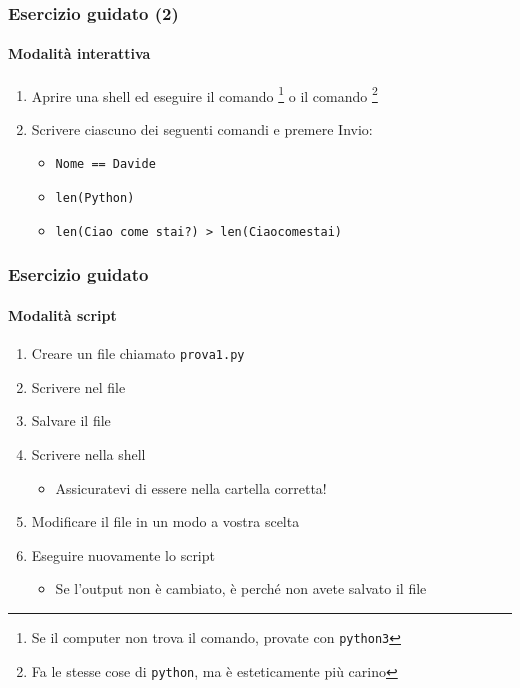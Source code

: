 \begin{exerciseframe}
    \frametitle{Esercizio guidato (2)}
    \framesubtitle{Modalità interattiva}

    \begin{enumerate}
        \item Aprire una shell ed eseguire il comando \footnote[frame]{Se il computer non trova il comando, provate con \texttt{python3}} o il comando \footnote[frame]{Fa le stesse cose di \texttt{python}, ma è esteticamente più carino}
        \item Scrivere ciascuno dei seguenti comandi e premere Invio:
            \begin{itemize}
                \item \texttt{\textquotesingle{}Nome\textquotesingle{} == \textquotesingle{}Davide\textquotesingle{}}
                \item \texttt{len(\textquotesingle{}Python\textquotesingle{})}
                \item \texttt{len(\textquotesingle{}Ciao come stai?\textquotesingle{}) > len(\textquotesingle{}Ciaocomestai\textquotesingle{})}
            \end{itemize}
    \end{enumerate}
\end{exerciseframe}


\begin{exerciseframe}
    \frametitle{Esercizio guidato}
    \framesubtitle{Modalità script}

    \begin{enumerate}
        \item Creare un file chiamato \texttt{prova1.py}
        \item Scrivere nel file 
        \item Salvare il file
        \item Scrivere nella shell 
        \begin{itemize}
            \item Assicuratevi di essere nella cartella corretta!
        \end{itemize}

        \pause
        \bigskip
        \item Modificare il file in un modo a vostra scelta
        \item Eseguire nuovamente lo script
        \begin{itemize}
            \item Se l'output non è cambiato, è perché non avete salvato il file
        \end{itemize}
    \end{enumerate}
\end{exerciseframe}

